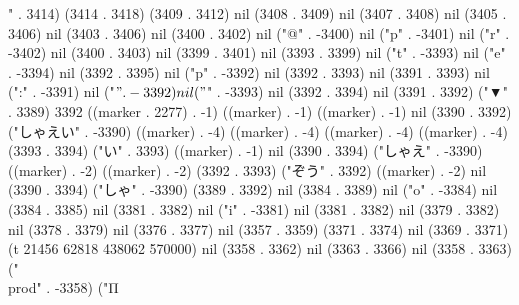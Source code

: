 " . 3414) (3414 . 3418) (3409 . 3412) nil (3408 . 3409) nil (3407 . 3408) nil (3405 . 3406) nil (3403 . 3406) nil (3400 . 3402) nil ("@" . -3400) nil ("p" . -3401) nil ("r" . -3402) nil (3400 . 3403) nil (3399 . 3401) nil (3393 . 3399) nil ("t" . -3393) nil ("e" . -3394) nil (3392 . 3395) nil ("p" . -3392) nil (3392 . 3393) nil (3391 . 3393) nil (":" . -3391) nil ("$" . -3392) nil ("$" . -3393) nil (3392 . 3394) nil (3391 . 3392) ("▼" . 3389) 3392 ((marker . 2277) . -1) ((marker) . -1) ((marker) . -1) nil (3390 . 3392) ("しゃえい" . -3390) ((marker) . -4) ((marker) . -4) ((marker) . -4) ((marker) . -4) (3393 . 3394) ("い" . 3393) ((marker) . -1) nil (3390 . 3394) ("しゃえ" . -3390) ((marker) . -2) ((marker) . -2) (3392 . 3393) ("ぞう" . 3392) ((marker) . -2) nil (3390 . 3394) ("しゃ" . -3390) (3389 . 3392) nil (3384 . 3389) nil ("o" . -3384) nil (3384 . 3385) nil (3381 . 3382) nil ("i" . -3381) nil (3381 . 3382) nil (3379 . 3382) nil (3378 . 3379) nil (3376 . 3377) nil (3357 . 3359) (3371 . 3374) nil (3369 . 3371) (t 21456 62818 438062 570000) nil (3358 . 3362) nil (3363 . 3366) nil (3358 . 3363) ("\\prod" . -3358) ("Π
